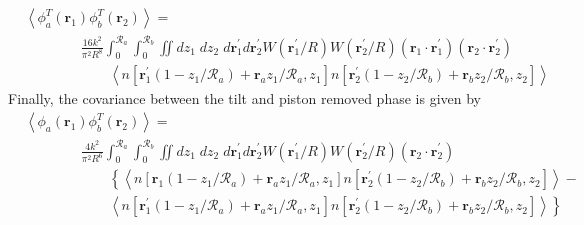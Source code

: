 \begin{equation}\label{tphase_n}
\begin{aligned}
&\left\langle \phi^{T}_{a}\left(\boldsymbol{r}_{1}\right) \phi^{T}_{b}\left(\boldsymbol{r}_{2}\right)\right\rangle = \\
&\quad\quad\quad\quad
\frac{16 k^{2}}{\pi^{2}R^{8}} \int_{0}^{\mathcal{R}_{a}}  \int_{0}^{\mathcal{R}_{b}} \iint dz_{1} \; dz_{2} \; d\boldsymbol{r}^{\prime}_{1}d\boldsymbol{r}^{\prime}_{2} W(\boldsymbol{r}^{\prime}_{1}/R) W(\boldsymbol{r}^{\prime}_{2}/R)
\left(\boldsymbol{r}_{1} \cdot \boldsymbol{r}^{\prime}_{1}\right)
\left(\boldsymbol{r}_{2} \cdot \boldsymbol{r}^{\prime}_{2}\right)
\\
&\quad\quad\quad\quad\quad\quad
\left\langle n\left[\boldsymbol{r}^{\prime}_{1}\left(1-z_{1}/\mathcal{R}_{a}\right) + \boldsymbol{r}_{a} z_{1}/\mathcal{R}_{a}, z_{1}\right]
 n\left[\boldsymbol{r}^{\prime}_{2}\left(1-z_{2}/\mathcal{R}_{b}\right) + \boldsymbol{r}_{b} z_{2}/\mathcal{R}_{b}, z_{2}\right] \right\rangle
\end{aligned}
\end{equation}
Finally, the covariance between the tilt and piston removed phase is given by 
\begin{equation}\label{tprphase_n}
\begin{aligned}
&\left\langle \phi_{a}\left(\boldsymbol{r}_{1}\right) \phi^{T}_{b}\left(\boldsymbol{r}_{2}\right)\right\rangle = \\
&\quad\quad\quad\quad
\frac{4 k^{2}}{\pi^{2}R^{6}} \int_{0}^{\mathcal{R}_{a}}  \int_{0}^{\mathcal{R}_{b}} \iint dz_{1} \; dz_{2} \; d\boldsymbol{r}^{\prime}_{1}d\boldsymbol{r}^{\prime}_{2} W(\boldsymbol{r}^{\prime}_{1}/R) W(\boldsymbol{r}^{\prime}_{2}/R)
\left(\boldsymbol{r}_{2} \cdot \boldsymbol{r}^{\prime}_{2}\right)
\\
&\quad\quad\quad\quad\quad\quad
\left\{
\left\langle n\left[\boldsymbol{r}_{1}\left(1-z_{1}/\mathcal{R}_{a}\right) + \boldsymbol{r}_{a} z_{1}/\mathcal{R}_{a}, z_{1}\right]
 n\left[\boldsymbol{r}^{\prime}_{2}\left(1-z_{2}/\mathcal{R}_{b}\right) + \boldsymbol{r}_{b} z_{2}/\mathcal{R}_{b}, z_{2}\right] \right\rangle - 
\right.
\\
&\quad\quad\quad\quad\quad\quad
\left.
\left\langle n\left[\boldsymbol{r}^{\prime}_{1}\left(1-z_{1}/\mathcal{R}_{a}\right) + \boldsymbol{r}_{a} z_{1}/\mathcal{R}_{a}, z_{1}\right]
 n\left[\boldsymbol{r}^{\prime}_{2}\left(1-z_{2}/\mathcal{R}_{b}\right) + \boldsymbol{r}_{b} z_{2}/\mathcal{R}_{b}, z_{2}\right] \right\rangle
\right\}
\end{aligned}
\end{equation}


